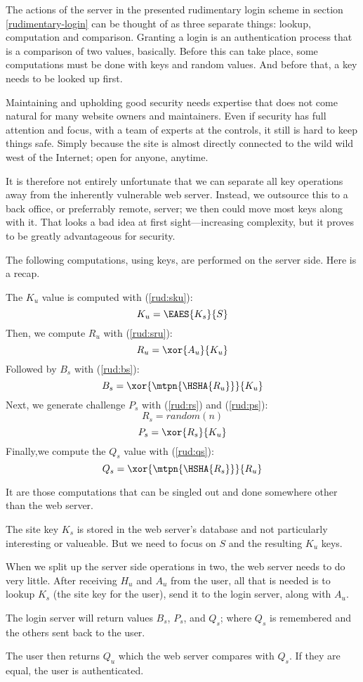 The actions of the server in the presented rudimentary login scheme in section \ref{rudimentary-login}
can be thought of as three separate things:
lookup,
computation and comparison.
Granting a login is an authentication process that is a comparison of two values, basically.
Before this can take place, some computations must be done with keys and random values.
And before that, a key needs to be looked up first.
\par
Maintaining and upholding good security needs expertise that does not come natural for many website owners and maintainers.
Even if security has full attention and focus, with a team of experts at the controls, it still is hard to keep things safe.
Simply because the site is almost directly connected to the wild wild west of the Internet; open for anyone, anytime.
\par
It is therefore not entirely unfortunate that we can separate all key operations away from the inherently vulnerable web server.
Instead, we outsource this to a back office, or preferrably remote, server; we then could move most keys along with it.
That looks a bad idea at first sight---increasing complexity, but it proves to be greatly advantageous for security.

The following computations, using keys, are performed on the server side.
Here is a recap.
\par
The \(K_u\) value is computed with (\ref{rud:sku}):
\[K_u = \EAES{K_s}{S}\]
Then, we compute \(R_u\) with (\ref{rud:sru}):
\[R_u = \xor{A_u}{K_u}\]
Followed by \(B_s\) with (\ref{rud:bs}):
\[B_s = \xor{\mtpn{\HSHA{R_u}}}{K_u}\]
Next, we generate challenge \(P_s\) with (\ref{rud:rs}) and (\ref{rud:ps}):
\[R_s = random(n)\]
\[P_s = \xor{R_s}{K_u}\]
Finally,we compute the \(Q_s\) value with (\ref{rud:qs}):
\[Q_s = \xor{\mtpn{\HSHA{R_s}}}{R_u}\]
\par
It are those computations that can be singled out and done somewhere other than the web server.
\par
The site key \(K_s\) is stored in the web server's database and not particularly interesting or valueable.
But we need to focus on \(S\) and the resulting \(K_u\) keys.

\par
When we split up the server side operations in two,
the web server needs to do very little.
After receiving \(H_u\) and \(A_u\) from the user,
all that is needed is to lookup \(K_s\)
(the site key for the user),
send it to the login server,
along with \(A_u\).
\par
The login server will return values \(B_s\), \(P_s\), and \(Q_s\);
where \(Q_s\) is remembered and the others sent back to the user.
\par
The user then returns \(Q_u\) which the web server compares with \(Q_s\).
If they are equal, the user is authenticated.

